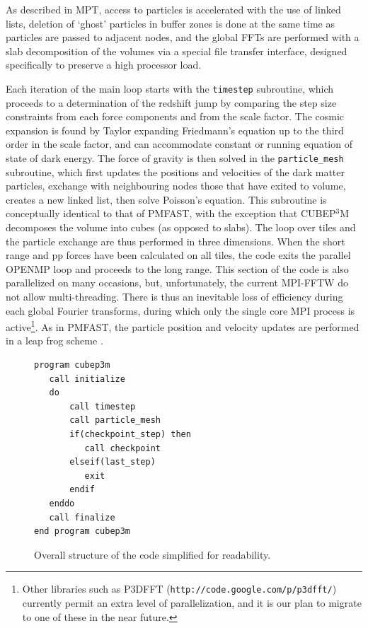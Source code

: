 \documentclass[useAMS,usenatbib]{mn2e}
\begin{document}
As described in MPT, access to particles is accelerated with the use of linked lists, deletion of `ghost' particles
in buffer zones is done at the same time as particles are passed to adjacent nodes,
and the global FFTs are performed with a slab decomposition of the volumes via a special file transfer interface, 
designed specifically to preserve a high processor load.


Each iteration of the main loop starts with the {\tt timestep} subroutine, 
which proceeds to a determination of the redshift jump by comparing the step size constraints from each
force components and from the scale factor.
The cosmic expansion is found by Taylor expanding Friedmann's equation up to the third order in the scale factor,
and can accommodate constant or running equation of state of dark energy.
The force of gravity is then solved  in the {\tt particle\_mesh} subroutine,
which first updates the positions and velocities of the dark matter particles, exchange with neighbouring nodes those that have exited to volume,
creates a new linked list, then solve Poisson's equation.  This subroutine is conceptually identical to that of {\small PMFAST}, 
with the exception  that {\small CUBEP$^3$M} decomposes the volume into cubes (as opposed to slabs). 
The loop over tiles and the particle exchange are thus performed in three dimensions.
When the short range and pp forces have been calculated on all tiles, the code exits the parallel {\small OPENMP} loop
and proceeds to the long range. This section of the code is also parallelized on many occasions, but, unfortunately, the current {\small MPI-FFTW}
do not allow multi-threading. There is thus an inevitable loss of efficiency during each global Fourier transforms, during which
only the single core {\small MPI} process is active\footnote{Other libraries such as {\small P3DFFT} ({\tt http://code.google.com/p/p3dfft/}) currently permit
 an extra level of parallelization, and it is our plan to migrate to one of these in the near future.}.
 As in {\small PMFAST}, the particle position and velocity updates are performed in a leap frog scheme \citep{1981csup.book.....H}.


\begin{figure}
\begin{verbatim}
program cubep3m
   call initialize
   do
       call timestep
       call particle_mesh
       if(checkpoint_step) then
          call checkpoint
       elseif(last_step)
          exit
       endif
   enddo
   call finalize
end program cubep3m
\end{verbatim}
\caption{Overall structure of the code simplified for readability.}
\label{fig:structure}
\end{figure}
\end{document}
